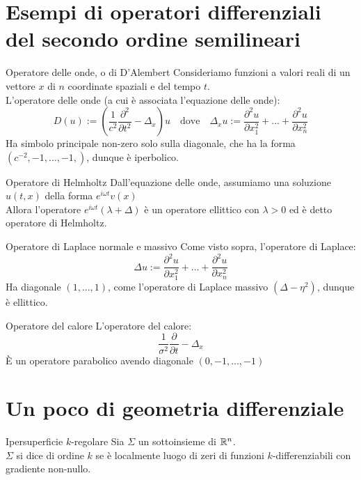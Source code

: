 \documentclass{article}
\begin{document}
\section{Esempi di operatori differenziali del secondo ordine semilineari}

\begin{example}{Operatore delle onde, o di D'Alembert}{}
    Consideriamo funzioni a valori reali di un vettore $x$ di $n$ coordinate spaziali e del tempo $t$.\\
    L'operatore delle onde (a cui è associata l'equazione delle onde):
    \[ D(u) := \left(\frac{1}{c^2}\frac{\partial^2}{\partial t^2} - \Delta_x\right) u \quad \text{dove}\quad \Delta_x u := \frac{\partial^2 u}{\partial x_1^2} +...+ \frac{\partial^2 u}{\partial x_n^2}\]
    Ha simbolo principale non-zero solo sulla diagonale, che ha la forma $(c^{-2},-1,...,-1,)$, dunque è iperbolico.
\end{example}

\begin{example}{Operatore di Helmholtz}{}
    Dall'equazione delle onde, assumiamo una soluzione $u(t,x)$ della forma $e^{i\omega t}v(x)$\\
    Allora l'operatore $e^{i\omega t}(\lambda + \Delta)$ è un operatore ellittico con $\lambda>0$ ed è detto operatore di Helmholtz.
\end{example}

\begin{example}{Operatore di Laplace normale e massivo}{}
    Come visto sopra, l'operatore di Laplace:
    \[\Delta u := \frac{\partial^2 u}{\partial x_1^2} +...+ \frac{\partial^2 u}{\partial x_n^2}\]
    Ha diagonale $(1,...,1)$, come l'operatore di Laplace massivo $(\Delta - \eta^2)$, dunque è ellittico.
\end{example}

\begin{example}{Operatore del calore}{}
    L'operatore del calore:
    \[\frac{1}{\sigma^2} \frac{\partial}{\partial t} - \Delta_x\]
    È un operatore parabolico avendo diagonale $(0,-1,...,-1)$
\end{example}

\section{Un poco di geometria differenziale}

\begin{definition}{Ipersuperficie $k$-regolare}{}
    Sia $\Sigma$ un sottoinsieme di $\mathbb{R}^n$.\\
    $\Sigma$ si dice  di ordine $k$ se è localmente luogo di zeri di funzioni $k$-differenziabili con gradiente non-nullo.
\end{definition}
\end{document}
